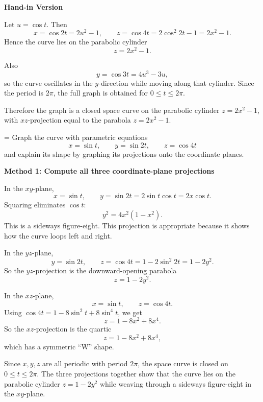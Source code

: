 \documentclass[a4paper,12pt,twocolumn]{article}
\newlength{\problemnumberwidth}
\newenvironment{solutionbox}{\begin{framed}}{\end{framed}}
\newcommand{\problem}[3]{%
  \Needspace{10\baselineskip}%
  \phantomsection\label{#1}%
  \par\vspace{0.8em}%
  \noindent
  \hangindent=\problemnumberwidth
  \hangafter=1
  \makebox[\problemnumberwidth][l]{\textbf{#2.}}#3\par
}
\begin{document}
\begin{solutionbox}
\textbf{Hand-in Version}

Let \(u=\cos t\). Then
\[
x=\cos 2t=2u^2-1,
\qquad
z=\cos 4t=2\cos^2 2t-1=2x^2-1.
\]
Hence the curve lies on the parabolic cylinder
\[
\boxed{z=2x^2-1.}
\]

Also
\[
y=\cos 3t=4u^3-3u,
\]
so the curve oscillates in the \(y\)-direction while moving along that cylinder. Since the period is \(2\pi\), the full graph is obtained for \(0\le t\le 2\pi\).

Therefore the graph is a closed space curve on the parabolic cylinder \(z=2x^2-1\), with \(xz\)-projection equal to the parabola \(z=2x^2-1\).
\end{solutionbox}

\problem{prob:13-1-46}{46}{Graph the curve with parametric equations
\[
x=\sin t,\qquad y=\sin 2t,\qquad z=\cos 4t
\]
and explain its shape by graphing its projections onto the coordinate planes.}

\begin{solutionbox}
\textbf{Method 1: Compute all three coordinate-plane projections}

\begin{steps}
\item In the \(xy\)-plane,
\[
x=\sin t,\qquad y=\sin 2t=2\sin t\cos t=2x\cos t.
\]
Squaring eliminates \(\cos t\):
\[
y^2=4x^2(1-x^2).
\]
This is a sideways figure-eight. This projection is appropriate because it shows how the curve loops left and right.

\item In the \(yz\)-plane,
\[
y=\sin 2t,\qquad z=\cos 4t=1-2\sin^2 2t=1-2y^2.
\]
So the \(yz\)-projection is the downward-opening parabola
\[
\boxed{z=1-2y^2.}
\]

\item In the \(xz\)-plane,
\[
x=\sin t,\qquad z=\cos 4t.
\]
Using \(\cos 4t=1-8\sin^2 t+8\sin^4 t\), we get
\[
z=1-8x^2+8x^4.
\]
So the \(xz\)-projection is the quartic
\[
\boxed{z=1-8x^2+8x^4,}
\]
which has a symmetric ``W'' shape.

\item Since \(x,y,z\) are all periodic with period \(2\pi\), the space curve is closed on \(0\le t\le 2\pi\). The three projections together show that the curve lies on the parabolic cylinder \(z=1-2y^2\) while weaving through a sideways figure-eight in the \(xy\)-plane.
\end{steps}
\end{solutionbox}
\end{document}
